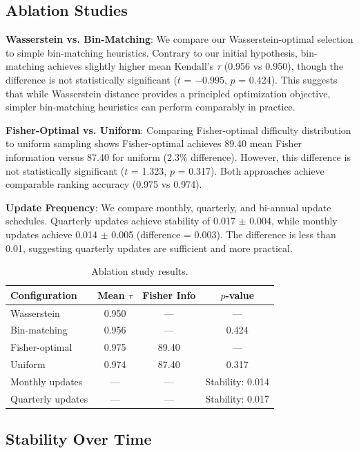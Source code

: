 \documentclass{article}
\begin{document}
\subsection{Ablation Studies}

\textbf{Wasserstein vs. Bin-Matching}: We compare our Wasserstein-optimal selection to simple bin-matching heuristics. Contrary to our initial hypothesis, bin-matching achieves slightly higher mean Kendall's $\tau$ (0.956 vs 0.950), though the difference is not statistically significant ($t$ = $-0.995$, $p$ = 0.424). This suggests that while Wasserstein distance provides a principled optimization objective, simpler bin-matching heuristics can perform comparably in practice.

\textbf{Fisher-Optimal vs. Uniform}: Comparing Fisher-optimal difficulty distribution to uniform sampling shows Fisher-optimal achieves 89.40 mean Fisher information versus 87.40 for uniform (2.3\% difference). However, this difference is not statistically significant ($t$ = 1.323, $p$ = 0.317). Both approaches achieve comparable ranking accuracy (0.975 vs 0.974).

\textbf{Update Frequency}: We compare monthly, quarterly, and bi-annual update schedules. Quarterly updates achieve stability of 0.017 $\pm$ 0.004, while monthly updates achieve 0.014 $\pm$ 0.005 (difference = 0.003). The difference is less than 0.01, suggesting quarterly updates are sufficient and more practical.

\begin{table}[t]
\caption{Ablation study results.}
\label{tab:ablation}
\centering
\begin{tabular}{lccc}
\toprule
Configuration & Mean $\tau$ & Fisher Info & $p$-value \\
\midrule
Wasserstein & 0.950 & --- & --- \\
Bin-matching & 0.956 & --- & 0.424 \\
\midrule
Fisher-optimal & 0.975 & 89.40 & --- \\
Uniform & 0.974 & 87.40 & 0.317 \\
\midrule
Monthly updates & --- & --- & Stability: 0.014 \\
Quarterly updates & --- & --- & Stability: 0.017 \\
\bottomrule
\end{tabular}
\end{table}

\subsection{Stability Over Time}
\end{document}
